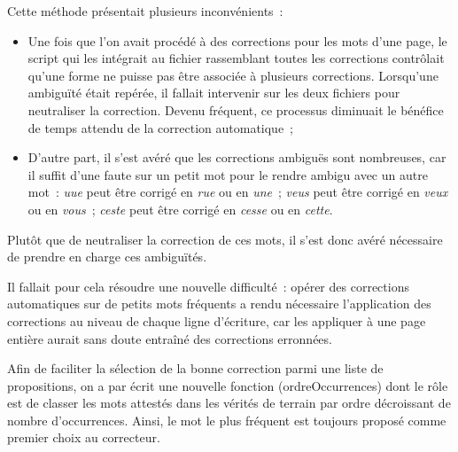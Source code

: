 \documentclass[a4paper,12pt,twoside]{book}
\begin{document}
				Cette méthode présentait plusieurs inconvénients~:

				\begin{itemize}
					\item Une fois que l'on avait procédé à des corrections pour les mots d'une page, le script qui les intégrait au fichier rassemblant toutes les corrections contrôlait qu'une forme ne puisse pas être associée à plusieurs corrections. Lorsqu'une ambiguïté était repérée, il fallait intervenir sur les deux fichiers pour neutraliser la correction. Devenu fréquent, ce processus diminuait le bénéfice de temps attendu de la correction automatique~;

					\item D'autre part, il s'est avéré que les corrections ambiguës sont nombreuses, car il suffit d'une faute sur un petit mot pour le rendre ambigu avec un autre mot~: \textit{uue} peut être corrigé en \textit{rue} ou en \textit{une}~; \textit{veus} peut être corrigé en \textit{veux} ou en \textit{vous}~; \textit{ceste} peut être corrigé en \textit{cesse} ou en \textit{cette}.
				
				\end{itemize}
				
				Plutôt que de neutraliser la correction de ces mots, il s'est donc avéré nécessaire de prendre en charge ces ambiguïtés.
				
				Il fallait pour cela résoudre une nouvelle difficulté~: opérer des corrections automatiques sur de petits mots fréquents a rendu nécessaire l'application des corrections au niveau de chaque ligne d'écriture, car les appliquer à une page entière aurait sans doute entraîné des corrections erronnées.
						
				Afin de faciliter la sélection de la bonne correction parmi une liste de propositions, on a par écrit une nouvelle fonction (\textsf{ordreOccurrences}) dont le rôle est de classer les mots attestés dans les vérités de terrain par ordre décroissant de nombre d'occurrences. Ainsi, le mot le plus fréquent est toujours proposé comme premier choix au correcteur.
			
	\appendix
	
	\renewcommand{\appendixpagename}{Annexes}
	
	\renewcommand{\appendixtocname}{Annexes}
	
	\addappheadtotoc%
	
\end{document}
